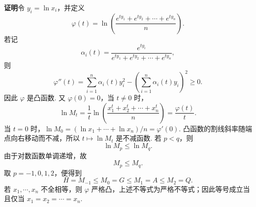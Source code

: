 \documentclass[UTF8,12pt,a4paper,fontset=fandol]{ctexart}
\begin{document}
\noindent\textbf{证明}\quad 令 $y_i=\ln x_i$，并定义
\[
  \varphi(t)=\ln\left(\frac{e^{t y_1}+e^{t y_2}+\cdots+e^{t y_n}}{n}\right).
\]
若记
\[
  \alpha_i(t)=\frac{e^{t y_i}}{e^{t y_1}+e^{t y_2}+\cdots+e^{t y_n}},
\]
则
\[
  \varphi''(t)
  =\sum_{i=1}^n\alpha_i(t)y_i^2
  -\left(\sum_{i=1}^n\alpha_i(t)y_i\right)^2\ge0.
\]
因此 $\varphi$ 是凸函数. 又 $\varphi(0)=0$，当 $t\ne0$ 时，
\[
  \ln M_t
  =\frac{1}{t}\ln\left(\frac{x_1^t+x_2^t+\cdots+x_n^t}{n}\right)
  =\frac{\varphi(t)}{t}.
\]
当 $t=0$ 时，$\ln M_0=(\ln x_1+\cdots+\ln x_n)/n=\varphi'(0)$. 凸函数的割线斜率随端点向右移动而不减，所以 $t\mapsto \ln M_t$ 是不减函数. 若 $p<q$，则
\[
  \ln M_p\le \ln M_q.
\]
由于对数函数单调递增，故
\[
  M_p\le M_q.
\]
取 $p=-1,0,1,2$，便得到
\[
  H=M_{-1}\le M_0=G\le M_1=A\le M_2=Q.
\]
若 $x_1,\cdots,x_n$ 不全相等，则 $\varphi$ 严格凸，上述不等式为严格不等式；因此等号成立当且仅当 $x_1=x_2=\cdots=x_n$.

\endgroup
\end{document}
